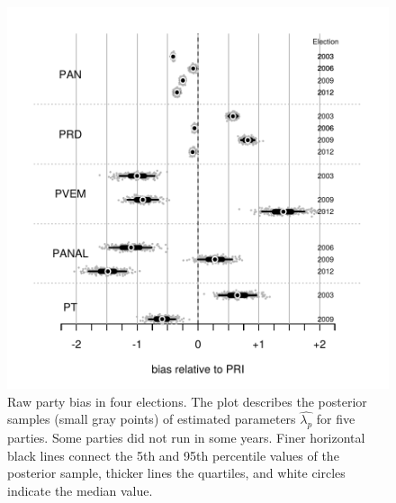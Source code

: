 \documentclass[letter,12pt]{article}
\newcommand{\mc}{\multicolumn}
\begin{document}
\begin{figure}
\begin{center}
    \includegraphics[width=.9\columnwidth]{bias200612d0R.pdf} 
  \caption{Raw party bias in four elections. The plot describes the posterior samples (small gray points) of estimated parameters $\hat{\lambda_p}$ for five parties. Some parties did not run in some years. Finer horizontal black lines connect the 5th and 95th percentile values of the posterior sample, thicker lines the quartiles, and white circles indicate the median value.}\label{F:posterior_s0s3}
\end{center}
\end{figure}
\end{document}
